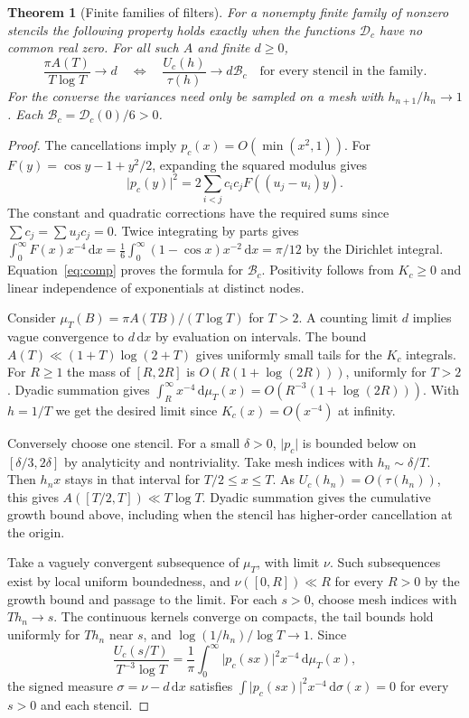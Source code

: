 \documentclass[11pt,letterpaper]{article}
\newtheorem{theorem}{Theorem}[section]
\newcommand{\dd}{\,\mathrm d}
\newcommand{\abs}[1]{\lvert#1\rvert}
\newcommand{\sym}{\mathcal D}
\newcommand{\BB}{\mathcal B}
\begin{document}
\begin{theorem}[Finite families of filters]\label{thm:bank}
For a nonempty finite family of nonzero stencils the following property holds exactly when the functions $\sym_c$ have no common real zero. For all such $A$ and finite $d\ge0$,
\[
 \frac{\pi A(T)}{T\log T}\longrightarrow d
 \quad\Longleftrightarrow\quad
 \frac{U_c(h)}{\tau(h)}\longrightarrow d\BB_c\quad\text{for every stencil in the family.}
\]
For the converse the variances need only be sampled on a mesh with $h_{n+1}/h_n\to1$. Each $\BB_c=\sym_c(0)/6>0$.
\end{theorem}
\begin{proof}
The cancellations imply $p_c(x)=O(\min(x^2,1))$. For $F(y)=\cos y-1+y^2/2$, expanding the squared modulus gives
\begin{equation}\label{eq:comp}
 \abs{p_c(y)}^2=2\sum_{i<j}c_ic_jF((u_j-u_i)y).
\end{equation}
The constant and quadratic corrections have the required sums since $\sum c_j=\sum u_jc_j=0$. Twice integrating by parts gives
$\int_0^\infty F(x)x^{-4}\dd x=\frac16\int_0^\infty(1-\cos x)x^{-2}\dd x=\pi/12$ by the Dirichlet integral. Equation~\eqref{eq:comp} proves the formula for $\BB_c$. Positivity follows from $K_c\ge0$ and linear independence of exponentials at distinct nodes.

Consider $\mu_T(B)=\pi A(TB)/(T\log T)$ for $T>2$. A counting limit $d$ implies vague convergence to $d\dd x$ by evaluation on intervals. The bound $A(T)\ll(1+T)\log(2+T)$ gives uniformly small tails for the $K_c$ integrals. For $R\ge1$ the mass of $[R,2R]$ is $O(R(1+\log(2R)))$, uniformly for $T>2$. Dyadic summation gives $\int_R^\infty x^{-4}\dd\mu_T(x)=O(R^{-3}(1+\log(2R)))$. With $h=1/T$ we get the desired limit since $K_c(x)=O(x^{-4})$ at infinity.

Conversely choose one stencil. For a small $\delta>0$, $\abs{p_c}$ is bounded below on $[\delta/3,2\delta]$ by analyticity and nontriviality. Take mesh indices with $h_n\sim\delta/T$. Then $h_nx$ stays in that interval for $T/2\le x\le T$. As $U_c(h_n)=O(\tau(h_n))$, this gives $A([T/2,T])\ll T\log T$. Dyadic summation gives the cumulative growth bound above, including when the stencil has higher-order cancellation at the origin.

Take a vaguely convergent subsequence of $\mu_T$, with limit $\nu$. Such subsequences exist by local uniform boundedness, and $\nu([0,R])\ll R$ for every $R>0$ by the growth bound and passage to the limit. For each $s>0$, choose mesh indices with $Th_n\to s$. The continuous kernels converge on compacts, the tail bounds hold uniformly for $Th_n$ near $s$, and $\log(1/h_n)/\log T\to1$. Since
\[
 \frac{U_c(s/T)}{T^{-3}\log T}
     =\frac1\pi\int_0^\infty \abs{p_c(sx)}^2 x^{-4}\dd\mu_T(x),
\]
the signed measure $\sigma=\nu-d\dd x$ satisfies $\int\abs{p_c(sx)}^2x^{-4}\dd\sigma(x)=0$ for every $s>0$ and each stencil.


\end{proof}
\end{document}
